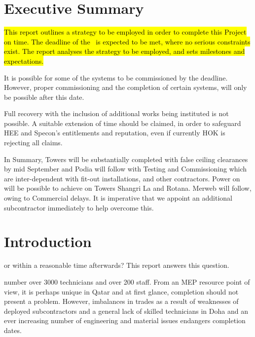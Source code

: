
\cleardoublepage

\chapter*{Executive Summary}


\hl{This report outlines a strategy to be employed in order to complete this Project on time. The deadline of the {\protect\deadline}~is expected to be met, where no serious constraints exist. The report analyses the strategy to be employed, and sets milestones and expectations. }

It is possible for some of the systems to be commissioned by the deadline. However, proper commissioning and the completion of certain systems, will only be possible after this date. 

Full recovery with the inclusion of additional works being instituted is not possible. A suitable extension of time should be claimed, in order to safeguard HEE and Specon's entitlements and reputation, even if currently HOK is rejecting all claims. 

In Summary, Towers will be substantially completed with false ceiling clearances by mid September and Podia will follow with Testing and Commissioning which are inter-dependent with fit-out installations, and other contractors. Power on will be possible to achieve on Towers Shangri La and Rotana. Merweb will follow, owing to Commercial delays. It is imperative that we appoint an additional subcontractor immediately to help overcome this.



\chapter{Introduction}
\label{ch:the-problem}

 or within a reasonable time afterwards? 
This report answers this question.

 number over 3000 technicians and over 200 staff. From an MEP resource point of view, it is perhaps unique in Qatar and at first glance, completion should not present a problem. However, imbalances in trades as a result of weaknesses of deployed subcontractors and a general lack of skilled technicians in Doha and an ever increasing number of engineering and material issues endangers completion dates.


